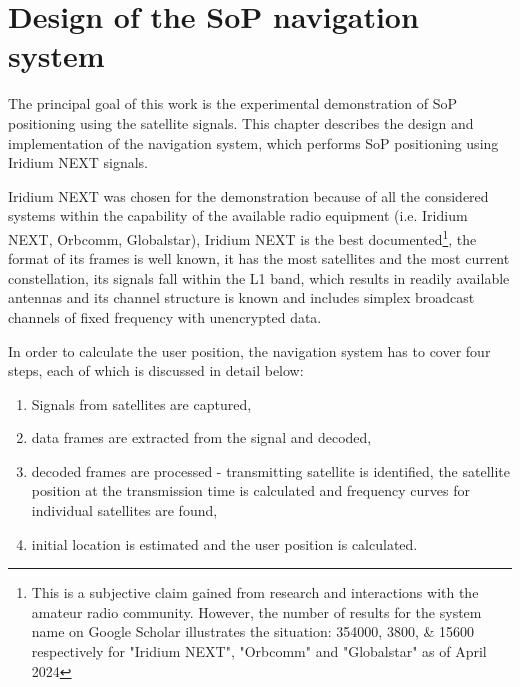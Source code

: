 \chapter{Design of the SoP navigation system}
\label{s_des}

The principal goal of this work is the experimental demonstration of SoP positioning using the satellite signals. This chapter describes the design and implementation of the navigation system, which performs SoP positioning using Iridium NEXT signals.

Iridium NEXT was chosen for the demonstration because of all the considered systems within the capability of the available radio equipment (i.e. Iridium NEXT, Orbcomm, Globalstar), Iridium NEXT is the best documented\footnote{This is a subjective claim gained from research and interactions with the amateur radio community. However, the number of results for the system name on Google Scholar illustrates the situation: \numlist{354000; 3800; 15600} respectively for "Iridium NEXT", "Orbcomm" and "Globalstar" as of April 2024}, the format of its frames is well known, it has the most satellites and the most current constellation, its signals fall within the L1 band, which results in readily available antennas and its channel structure is known and includes simplex broadcast channels of fixed frequency with unencrypted data.

In order to calculate the user position, the navigation system has to cover four steps, each of which is discussed in detail below:
\begin{enumerate}
    \item Signals from satellites are captured,
    \item data frames are extracted from the signal and decoded,
    \item decoded frames are processed - transmitting satellite is identified, the satellite position at the transmission time is calculated and frequency curves for individual satellites are found,
    \item initial location is estimated and the user position is calculated. 
\end{enumerate}

